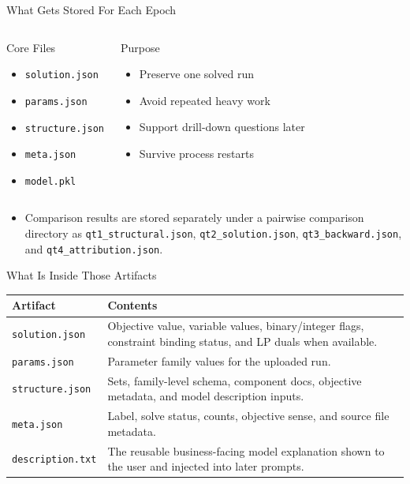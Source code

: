 \documentclass[10pt]{beamer}
\newcommand{\goodbox}[2]{
  \begin{block}{#1}
  #2
  \end{block}
}
\newcommand{\func}[1]{\texttt{#1}}
\begin{document}
\begin{frame}{What Gets Stored For Each Epoch}
  \begin{columns}[T]
    \goodbox{Core Files}{
      \begin{itemize}
        \item \func{solution.json}
        \item \func{params.json}
        \item \func{structure.json}
        \item \func{meta.json}
        \item \func{model.pkl}
      \end{itemize}
    }
    \goodbox{Purpose}{
      \begin{itemize}
        \item Preserve one solved run
        \item Avoid repeated heavy work
        \item Support drill-down questions later
        \item Survive process restarts
      \end{itemize}
    }
  \end{columns}
  \vspace{0.5em}
  \begin{itemize}
    \item Comparison results are stored separately under a pairwise comparison directory as \func{qt1\_structural.json}, \func{qt2\_solution.json}, \func{qt3\_backward.json}, and \func{qt4\_attribution.json}.
  \end{itemize}
\end{frame}

\begin{frame}{What Is Inside Those Artifacts}
  \small
  \begin{tabularx}{\textwidth}{>{\raggedright\arraybackslash}p{} X}
    \toprule
    \textbf{Artifact} & \textbf{Contents} \\
    \midrule
    \func{solution.json} & Objective value, variable values, binary/integer flags, constraint binding status, and LP duals when available. \\
    \func{params.json} & Parameter family values for the uploaded run. \\
    \func{structure.json} & Sets, family-level schema, component docs, objective metadata, and model description inputs. \\
    \func{meta.json} & Label, solve status, counts, objective sense, and source file metadata. \\
    \func{description.txt} & The reusable business-facing model explanation shown to the user and injected into later prompts. \\
    \bottomrule
  \end{tabularx}
\end{frame}
\end{document}
